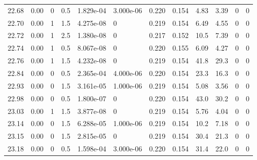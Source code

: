 \documentclass[preview]{standalone}
\begin{document}
{{{{{{{{{{\begin{tabular}{L{1.2cm}C{1.2cm} C{0.3cm}C{0.5cm} C{1.4cm}C{1.4cm} C{1.4cm}C{1.4cm} C{1.6cm}C{1.6cm} C{1.6cm}C{1.6cm}}
  22.68  &  0.00  & 0     & 0.5 &  1.829e-04  & 3.000e-06  &  0.220&   0.154& 4.83 & 3.39   &  0 & 0  \\ 
  22.70  &  0.00  & 1     & 1.5 &  4.275e-08  & 0  &  0.219&   0.154& 6.49 & 4.55   &  0 & 0  \\ 
  22.72  &  0.00  & 1     & 2.5 &  1.380e-08  & 0  &  0.217&   0.152& 10.5 & 7.39   &  0 & 0  \\ 
  22.74  &  0.00  & 1     & 0.5 &  8.067e-08  & 0  &  0.220&   0.155& 6.09 & 4.27   &  0 & 0  \\ 
  22.76  &  0.00  & 1     & 1.5 &  4.232e-08  & 0  &  0.219&   0.154& 41.8 & 29.3   &  0 & 0  \\ 
  22.84  &  0.00  & 0     & 0.5 &  2.365e-04  & 4.000e-06  &  0.220&   0.154& 23.3 & 16.3   &  0 & 0  \\ 
  22.93  &  0.00  & 0     & 1.5 &  3.161e-05  & 1.000e-06  &  0.219&   0.154& 5.08 & 3.56   &  0 & 0  \\ 
  22.98  &  0.00  & 0     & 0.5 &  1.800e-07  & 0  &  0.220&   0.154& 43.0 & 30.2   &  0 & 0  \\ 
  23.03  &  0.00  & 1     & 1.5 &  3.877e-08  & 0  &  0.219&   0.154& 5.76 & 4.04   &  0 & 0  \\ 
  23.14  &  0.00  & 0     & 1.5 &  6.288e-05  & 1.000e-06  &  0.219&   0.154& 10.2 & 7.18   &  0 & 0  \\ 
  23.15  &  0.00  & 0     & 1.5 &  2.815e-05  & 0  &  0.219&   0.154& 30.4 & 21.3   &  0 & 0  \\ 
  23.18  &  0.00  & 0     & 0.5 &  1.598e-04  & 3.000e-06  &  0.220&   0.154& 31.4 & 22.0   &  0 & 0  \\ 
\hline 
\end{tabular} 

}}}}}}}}}}
\end{document}
